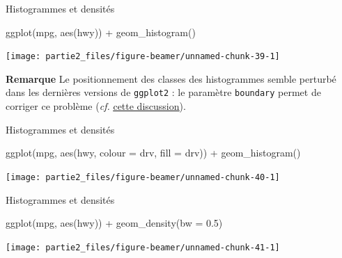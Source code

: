 \documentclass[12pt,ignorenonframetext,]{beamer}
\newenvironment{Shaded}{}{}
\newcommand{\KeywordTok}[1]{\textcolor[rgb]{0.00,0.00,1.00}{#1}}
\newcommand{\DataTypeTok}[1]{#1}
\newcommand{\FloatTok}[1]{#1}
\newcommand{\StringTok}[1]{\textcolor[rgb]{0.00,0.50,0.50}{#1}}
\newcommand{\OperatorTok}[1]{#1}
\newcommand{\NormalTok}[1]{#1}
\renewenvironment{Shaded}{\begin{snugshade}}{\end{snugshade}}
\begin{document}
\begin{frame}[fragile]{Histogrammes et densités}

\footnotesize \center

\vspace{-0.3cm}

\begin{Shaded}
\begin{Highlighting}[]
\KeywordTok{ggplot}\NormalTok{(mpg, }\KeywordTok{aes}\NormalTok{(hwy)) }\OperatorTok{+}\StringTok{ }\KeywordTok{geom_histogram}\NormalTok{()}
\end{Highlighting}
\end{Shaded}

\texttt{[image: partie2\_files/figure-beamer/unnamed-chunk-39-1]}

\pause \raggedright \small \vspace{-0.3cm}

\textbf{Remarque} Le positionnement des classes des histogrammes semble
perturbé dans les dernières versions de \texttt{ggplot2} : le paramètre
\texttt{boundary} permet de corriger ce problème (\emph{cf.}
\href{http://stackoverflow.com/questions/37876096/geom-histogram-wrong-bins}{\underline{cette discussion}}).

\end{frame}

\begin{frame}[fragile]{Histogrammes et densités}

\footnotesize \center

\begin{Shaded}
\begin{Highlighting}[]
\KeywordTok{ggplot}\NormalTok{(mpg, }\KeywordTok{aes}\NormalTok{(hwy, }\DataTypeTok{colour =}\NormalTok{ drv, }\DataTypeTok{fill =}\NormalTok{ drv)) }\OperatorTok{+}\StringTok{ }
\StringTok{  }\KeywordTok{geom_histogram}\NormalTok{()}
\end{Highlighting}
\end{Shaded}

\texttt{[image: partie2\_files/figure-beamer/unnamed-chunk-40-1]}

\end{frame}

\begin{frame}[fragile]{Histogrammes et densités}

\footnotesize \center

\begin{Shaded}
\begin{Highlighting}[]
\KeywordTok{ggplot}\NormalTok{(mpg, }\KeywordTok{aes}\NormalTok{(hwy)) }\OperatorTok{+}\StringTok{ }\KeywordTok{geom_density}\NormalTok{(}\DataTypeTok{bw =} \FloatTok{0.5}\NormalTok{)}
\end{Highlighting}
\end{Shaded}

\texttt{[image: partie2\_files/figure-beamer/unnamed-chunk-41-1]}

\end{frame}
\end{document}
